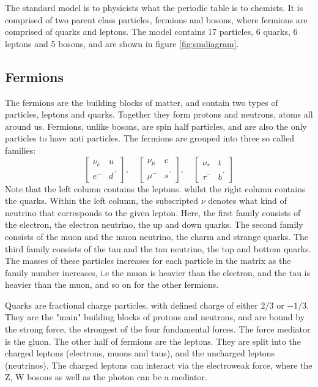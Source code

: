 The standard model is to physicists what the periodic table is to chemists. It is comprised of two parent class particles, fermions and bosons, where fermions 
are comprised of quarks and leptons. The model contains 17 particles, 6 quarks, 6 leptons and 5 bosons, and are shown in figure \ref{fig:smdiagram}.



\subsection*{Fermions}
The fermions are the building blocks of matter, and contain two types of particles, leptons and quarks. Together they form protons and neutrons,  atoms all around us.
Fermions, unlike bosons, are spin half particles, and are also the only particles to have anti particles. The fermions are grouped into three so called families:
\begin{equation*}
    \begin{bmatrix}
        \nu_e & u \\
        e^{-} & d^{\, '} 
    \end{bmatrix},\quad
    \begin{bmatrix}
        \nu_{\mu} & c \\
        \mu^{-} & s^{\, '}
    \end{bmatrix},\quad
    \begin{bmatrix}
        \nu_{\tau} & t \\
        \tau^{-} & b^{\, '}
    \end{bmatrix}
\end{equation*}
Note that the left column contains the leptons. whilst the right column contains the quarks. Within the left column, the subscripted $\nu$ denotes what kind of neutrino that corresponds 
to the given lepton. Here, the first family consists of the electron, the electron neutrino, the up and down quarks. The second family consists of the muon and the
muon neutrino, the charm and strange quarks. The third family consists of the tau and the tau neutrino, the top and bottom quarks. The masses of these particles 
increases for each particle in the matrix as the family number increases, i.e the muon is heavier than the electron, and the tau is heavier than the muon, and so 
on for the other fermions. \par
Quarks are fractional charge particles, with defined charge of either $2/3$ or $-1/3$. They are the "main" building blocks of protons and neutrons, and are bound by the strong 
force, the strongest of the four fundamental forces. The force mediator is the gluon. The other half of fermions are the leptons. They are split into the charged 
leptons (electrons, muons and taus), and the uncharged leptons (neutrinos). The charged leptons can interact via the electroweak force, where the Z, W bosons 
as well as the photon can be a mediator.


